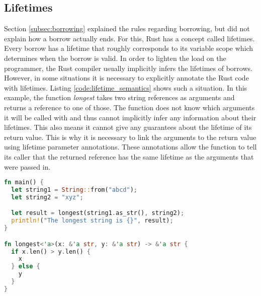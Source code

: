 \subsection{Lifetimes}
Section \ref{subsec:borrowing} explained the rules regarding borrowing, but did not explain how a borrow actually ends.
For this, Rust has a concept called lifetimes.
Every borrow has a lifetime that roughly corresponds to its variable scope which determines when the borrow is valid.
In order to lighten the load on the programmer, the Rust compiler usually implicitly infers the lifetimes of borrows.
However, in some situations it is necessary to explicitly annotate the Rust code with lifetimes.
Listing \ref{code:lifetime_semantics} shows such a situation.
In this example, the function \textit{longest} takes two string references as arguments and returns a reference to one of those.
The function does not know which arguments it will be called with and thus cannot implicitly infer any information about their lifetimes.
This also means it cannot give any guarantees about the lifetime of its return value.
This is why it is necessary to link the arguments to the return value using lifetime parameter annotations.
These annotations allow the function to tell its caller that the returned reference has the same lifetime as the arguments that were passed in.
\begin{lstlisting}[language=Rust,frame=single,caption=Lifetime Example,label=code:lifetime_semantics]
fn main() {
  let string1 = String::from("abcd");
  let string2 = "xyz";

  let result = longest(string1.as_str(), string2);
  println!("The longest string is {}", result);
}

fn longest<'a>(x: &'a str, y: &'a str) -> &'a str {
  if x.len() > y.len() {
    x
  } else {
    y
  }
}
\end{lstlisting} %


